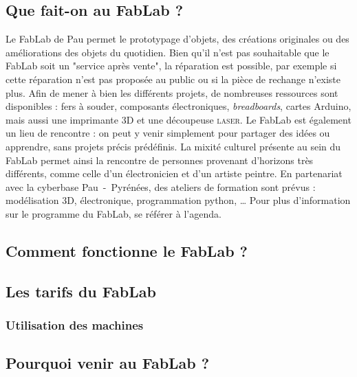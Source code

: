\subsection{Que fait-on au FabLab ?}
Le FabLab de Pau permet le prototypage d'objets, des créations originales ou des améliorations des objets du quotidien.
Bien qu'il n'est pas souhaitable que le FabLab soit un "service après vente", la réparation est possible, par exemple si cette réparation n'est pas proposée au public ou si la pièce de rechange n'existe plus.
Afin de mener à bien les différents projets, de nombreuses ressources sont disponibles : fers à souder, composants électroniques, \textit{breadboards}, cartes Arduino, mais aussi une imprimante 3D et une découpeuse \textsc{laser}.
Le FabLab est également un lieu de rencontre : on peut y venir simplement pour partager des idées ou apprendre, sans projets précis prédéfinis. La mixité culturel présente au sein du FabLab permet ainsi la rencontre de personnes provenant d'horizons très différents, comme celle d'un électronicien et d'un artiste peintre.
En partenariat avec la cyberbase Pau~-~Pyrénées, des ateliers de formation sont prévus : modélisation 3D, électronique, programmation python, \dots
Pour plus d'information sur le programme du FabLab, se référer à l'agenda.

\subsection{Comment fonctionne le FabLab ?}

\subsection{Les tarifs du FabLab}

\subsubsection{Utilisation des machines}

\subsection{Pourquoi venir au FabLab ?}
